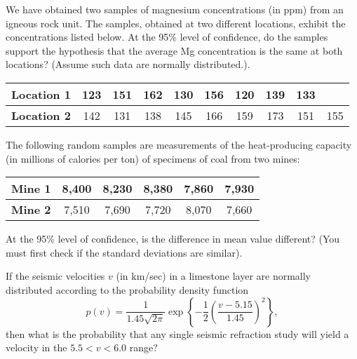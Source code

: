 \begin{problem}
We have obtained two samples of magnesium concentrations (in ppm) from an igneous rock unit.
The samples, obtained at two different locations, exhibit the concentrations listed below.
At the 95\% level of confidence, do the samples support the hypothesis that the average
Mg concentration is the same at both locations? (Assume such data are normally distributed.).
\begin{table}[H]
\centering
\begin{tabular}{|l||c|c|c|c|c|c|c|c|c|} \hline
\bf{Location 1} & 123 &  151 & 162 & 130 & 156 & 120 & 139 & 133 & \\ \hline
\bf{Location 2} & 142 &  131 & 138 & 145 & 166 & 159 & 173 & 151 & 155 \\ \hline
\end{tabular}
\end{table}
\end{problem}

\begin{problem}
The following random samples are measurements of the heat-producing capacity (in millions of calories
per ton) of specimens of coal from two mines:
\begin{table}[H]
\centering
\begin{tabular}{|l||c|c|c|c|c|} \hline
\bf{Mine 1} & 8,400 &  8,230 & 8,380 & 7,860 & 7,930 \\ \hline
\bf{Mine 2} & 7,510 &  7,690 & 7,720 & 8,070 & 7,660 \\ \hline
\end{tabular}
\end{table}
At the 95\% level of confidence, is the difference in mean value different?
(You must first check if the standard deviations are similar).
\end{problem}

\begin{problem}
If the seismic velocities $v$ (in km/sec) in a limestone layer are normally distributed according to the probability density function
$$
p(v) = \frac{1}{1.45\sqrt{2\pi}} \exp{\left \{ -\frac{1}{2} \left (\frac{v - 5.15}{1.45} \right )^2 \right \}},
$$
then what is the probability that any single seismic refraction study will yield a velocity in the $5.5 < v < 6.0$ range?
\end{problem}

